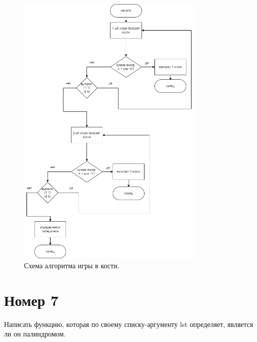 \begin{figure}[H]
    \begin{imagebox}
        \centering
        \includegraphics[width=0.8\textwidth]{../6.drawio.png}
    \end{imagebox}
    \caption{Схема алгоритма игры в кости.}
\end{figure}

\begin{figure}[H]
    \begin{listingbox}{}
        
    \end{listingbox}
    \label{lst:6}
\end{figure}

\section{Номер 7}

Написать функцию, которая по своему списку-аргументу lst 
определяет, является ли он палиндромом.

\begin{figure}[H]
    \begin{listingbox}{}
        
    \end{listingbox}
    \label{lst:7}
\end{figure}

